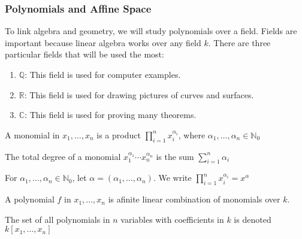            \subsubsection{Polynomials and Affine Space}
                To link algebra and geometry, we will study
                polynomials over a field. Fields are important
                because linear algebra works over any field $k$.
                There are three particular fields that will
                be used the most:
                \begin{enumerate}
                    \item $\mathbb{Q}$: This field is used
                          for computer examples.
                    \item $\mathbb{R}$: This field is used
                          for drawing pictures of curves and surfaces.
                    \item $\mathbb{C}$: This field is used
                          for proving many theorems.
                \end{enumerate}
                \begin{definition}
                    A monomial in $x_1,\hdots,x_n$ is a product
                    $\prod_{i=1}^{n}x_{i}^{\alpha_{i}}$, where
                    $\alpha_{1},\hdots,\alpha_{n}\in\mathbb{N}_0$
                \end{definition}
                \begin{definition}
                    The total degree of a monomial
                    $x_1^{\alpha_1}\cdots x_n^{\alpha_n}$ is
                    the sum $\sum_{i=1}^{n}\alpha_{i}$
                \end{definition}
                \begin{notation}
                    For $\alpha_1,\hdots,\alpha_n\in\mathbb{N}_0$,
                    let $\alpha=(\alpha_1,\hdots,\alpha_n)$.
                    We write
                    $\prod_{i=1}^{n}x_{i}^{\alpha_{i}}=x^{\alpha}$
                \end{notation}
                \begin{definition}
                    A polynomial $f$ in $x_1,\hdots, x_n$
                    is afinite linear combination of
                    monomials over $k$.
                \end{definition}
                \begin{notation}
                    The set of all polynomials in $n$
                    variables with coefficients in $k$ is
                    denoted $k[x_1,\hdots ,x_n]$
                \end{notation}
